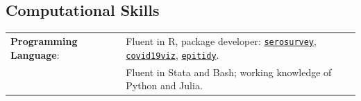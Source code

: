 \documentclass[margin,line]{res}
\begin{document}
\begin{resume}
\section{\sc Computational Skills}
\begin{tabular}{ l l}
	{\bf Programming Language}: & Fluent in R, package developer: %
	\href{https://avallecam.github.io/serosurvey/}{\texttt{serosurvey}}, 
	\href{https://avallecam.github.io/covid19viz/}{\texttt{covid19viz}},
	\href{https://github.com/avallecam/epitidy/}{\texttt{epitidy}}.
	\\ 
	& Fluent in Stata and Bash; working knowledge of Python and Julia.\\ %
\end{tabular}


\end{resume}
\end{document}
